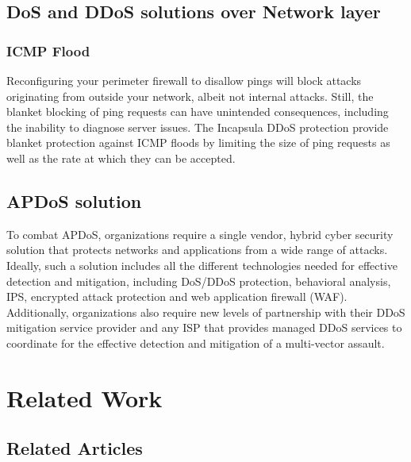 \documentclass{report}
\begin{document}
\section {DoS and DDoS solutions over Network layer} 

\subsection {ICMP Flood} Reconfiguring your perimeter firewall to disallow pings will block attacks originating from outside your network, albeit not internal attacks. Still, the blanket blocking of ping requests can have unintended consequences, including the inability to diagnose server issues.
The Incapsula DDoS protection provide blanket protection against ICMP floods by limiting the size of ping requests as well as the rate at which they can be accepted.

 \hfill \break

\section {APDoS solution}

 \hfill \break To combat APDoS, organizations require a single vendor, hybrid cyber security solution that protects networks and applications from a wide range of attacks. Ideally, such a solution includes all the different technologies needed for effective detection and mitigation, including DoS/DDoS protection, behavioral analysis, IPS, encrypted attack protection and web application firewall (WAF). Additionally, organizations also require new levels of partnership with their DDoS mitigation service provider and any ISP that provides managed DDoS services to coordinate for the effective detection and mitigation of a multi-vector assault.

\newpage
\chapter {Related Work}
\section {Related Articles}
\end{document}
